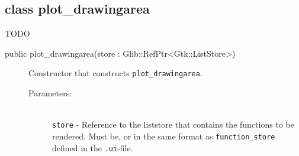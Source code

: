 \documentclass[a4paper,11pt]{kth-mag}
\begin{document}
\subsection{class plot\_drawingarea}

TODO
\begin{description}
    \item[public plot\_drawingarea(store : Glib::RefPtr<Gtk::ListStore>)] Constructor 
    that constructs \texttt{plot\_drawingarea}. 
    \begin{description}
        \item[Parameters:]~\\
            \verb+store+ - Reference to the liststore that contains the
            functions to be rendered. Must be, or in the same format as
            \texttt{function\_store} defined in the \texttt{.ui}-file.
    \end{description}
\end{description}
\end{document}
